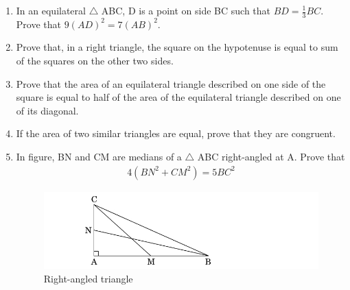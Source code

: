 \begin{enumerate}
	\item In an equilateral $\triangle$ ABC, D is a point on side BC such that $ BD =\frac{1}{3}BC$. Prove that $9(AD)^2 = 7(AB)^2$.
	\hfill{}\item Prove that, in a right triangle, the  square on the hypotenuse is equal to sum of the squares on the other two sides.
	\hfill{}\item Prove that the area of an equilateral triangle described on one side of the square is equal to half of the area of the equilateral triangle described on one of its diagonal.
	\hfill{}\item If the area of two similar triangles are equal, prove that they are congruent.
\hfill{}
\item In figure, BN and CM are medians of a $\triangle$ ABC right-angled at A. Prove that \begin{align}4(BN^2 +CM^2) = 5BC^2\end{align} 
\begin{figure}[!ht]
\centering
\includegraphics[width=\columnwidth]{cbse/figs/rightangled}
\caption{Right-angled triangle}
\label{fig:rightangled4}
\end{figure}


\end{enumerate}
